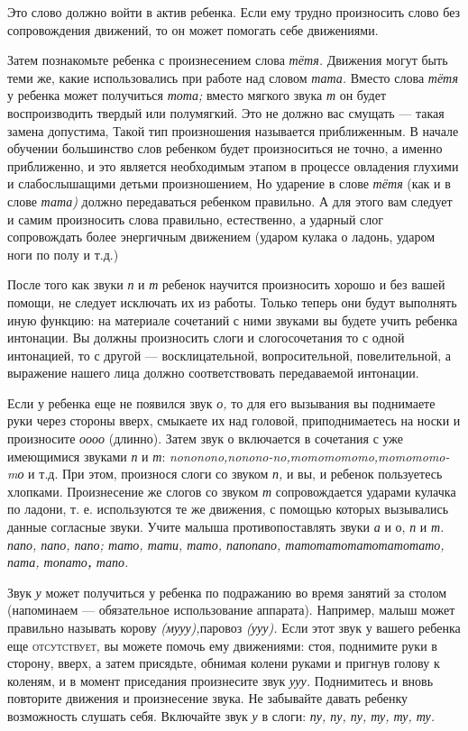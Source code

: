 \documentclass{book}
\renewcommand{\emph}[1]{\textit{#1}}
\begin{document}
Это слово должно войти в актив ребенка. Если ему трудно произносить
слово без сопровождения движений, то он может помогать себе движениями.

Затем познакомьте ребенка с произнесением слова \emph{тётя.} Движения
могут быть теми же, какие использовались при работе над словом
\emph{тата.} Вместо слова \emph{тётя} у ребенка может получиться
\emph{тота;} вместо мягкого звука \emph{т} он будет воспроизводить
твердый или полумягкий. Это не должно вас смущать --- такая замена
допустима, Такой тип произношения называется приближенным. В начале
обучении большинство слов ребенком будет произноситься не точно, а
именно приближенно, и это является необходимым этапом в процессе
овладения глухими и слабослышащими детьми произношением, Но ударение в
слове \emph{тётя} (как и в слове \emph{тата)} должно передаваться
ребенком правильно. А для этого вам следует и самим произносить слова
правильно, естественно, а ударный слог сопровождать более энергичным
движением (ударом кулака о ладонь, ударом ноги по полу и т.д.)

После того как звуки \emph{п} и \emph{т} ребенок научится произносить
хорошо и без вашей помощи, не следует исключать их из работы. Только
теперь они будут выполнять иную функцию: на материале сочетаний с ними
звуками вы будете учить ребенка интонации. Вы должны произносить слоги и
слогосочетания то с одной интонацией, то с другой --- восклицательной,
вопросительной, повелительной, а выражение нашего лица должно
соответствовать передаваемой интонации.

Если у ребенка еще не появился звук \emph{о,} то для его вызывания вы
поднимаете руки через стороны вверх, смыкаете их над головой,
приподнимаетесь на носки и произносите \emph{оооо} (длинно). Затем звук
о включается в сочетания с уже имеющимися звуками \emph{п} и \emph{т}:
\emph{nononono,nonono-no,momomomomo,momomomo-mо} и т.д. При этом,
произнося слоги со звуком \emph{п,} и вы, и ребенок пользуетесь
хлопками. Произнесение же слогов со звуком \emph{т} сопровождается
ударами кулачка по ладони, т. е. используются те же движения, с помощью
которых вызывались данные согласные звуки. Учите малыша
противопоставлять звуки \emph{а} и о, \emph{п} и \emph{т. папо, папо,
папо; тато, тати, тато, папопапо, татотатотатотатотато, пата,
топато\textbf{,} тапо.}

Звук \emph{у} может получиться у ребенка по подражанию во время занятий
за столом (напоминаем --- обязательное использование аппарата).
Например, малыш может правильно называть корову \emph{(мууу),}паровоз
\emph{(ууу).} Если этот звук у вашего ребенка еще \textsc{отсутствует,}
вы можете помочь ему движениями: стоя, поднимите руки в сторону, вверх,
а затем присядьте, обнимая колени руками и пригнув голову к коленям, и в
момент приседания произнесите звук \emph{ууу.} Поднимитесь и вновь
повторите движения и произнесение звука. Не забывайте давать ребенку
возможность слушать себя. Включайте звук \emph{у} в слоги: \emph{пу, пу,
пу, ту, ту, ту.}
\end{document}
